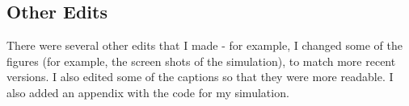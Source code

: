 \documentclass[paper=a4, fontsize=11pt]{scrartcl} %
\numberwithin{equation}{section} %
\numberwithin{figure}{section} %
\numberwithin{table}{section} %
\begin{document}
	\subsection {Other Edits}
	
	There were several other edits that I made - for example, I changed some of the figures (for example, the screen shots of the simulation), to match more recent versions. I also edited some of the captions so that they were more readable. I also added an appendix with the code for my simulation.
	
	
	
	
	
	
	
	
	
\end{document}
